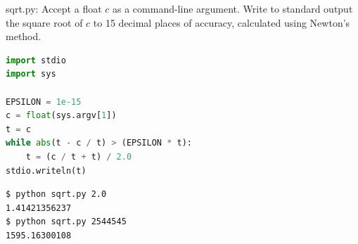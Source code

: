 \documentclass[8pt,a4paper,compress]{beamer}
\begin{document}
\begin{frame}[fragile]
\pause

\begin{framed}
\tiny sqrt.py: Accept a float $c$ as a command-line argument. Write to standard output the square root of $c$ to 15 decimal places of accuracy, calculated using Newton's method.
\end{framed}

\begin{minipage}{150pt}
\begin{lstlisting}[language=Python]
import stdio
import sys

EPSILON = 1e-15
c = float(sys.argv[1])
t = c
while abs(t - c / t) > (EPSILON * t):
    t = (c / t + t) / 2.0
stdio.writeln(t)
\end{lstlisting}
\end{minipage}%
\begin{minipage}{150pt}
\hfill {}
\end{minipage}

\pause

\begin{lstlisting}[language={}]
$ python sqrt.py 2.0
1.41421356237
$ python sqrt.py 2544545
1595.16300108
\end{lstlisting}
\end{frame}
\end{document}
